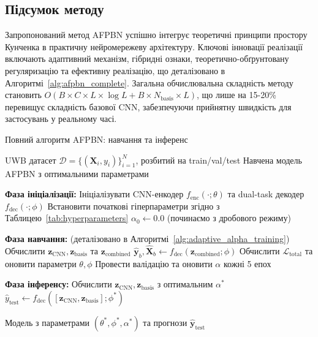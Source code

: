 \documentclass[12pt,a4paper]{article}
\begin{document}
\subsection{Підсумок методу}
\label{sec:method_summary}

Запропонований метод AFPBN успішно інтегрує теоретичні принципи простору Кунченка в практичну нейромережеву архітектуру. Ключові інновації реалізації включають адаптивний механізм, гібридні ознаки, теоретично-обґрунтовану регуляризацію та ефективну реалізацію, що деталізовано в Алгоритмі~\ref{alg:afpbn_complete}. Загальна обчислювальна складність методу становить $O(B \times C \times L \times \log L + B \times N_{\text{basis}} \times L)$, що лише на 15-20\% перевищує складність базової CNN, забезпечуючи прийнятну швидкість для застосувань у реальному часі.

\begin{algorithm}[htbp]
	\caption{Повний алгоритм AFPBN: навчання та інференс}
	\label{alg:afpbn_complete}
	\begin{algorithmic}[1]
		\REQUIRE UWB датасет $\mathcal{D} = \{(\mathbf{X}_i, y_i)\}_{i=1}^N$, розбитий на train/val/test
		\ENSURE Навчена модель AFPBN з оптимальними параметрами
		
		\STATE \textbf{Фаза ініціалізації:}
		\STATE Ініціалізувати CNN-енкодер $f_{\text{enc}}(\cdot; \theta)$ та dual-task декодер $f_{\text{dec}}(\cdot; \phi)$
		\STATE Встановити початкові гіперпараметри згідно з Таблицею~\ref{tab:hyperparameters}
		\STATE $\alpha_0 \leftarrow 0.0$ (починаємо з дробового режиму)
		
		\STATE \textbf{Фаза навчання:} (деталізовано в Алгоритмі~\ref{alg:adaptive_alpha_training})
		\STATE Обчислити $\mathbf{z}_{\text{CNN}}, \mathbf{z}_{\text{basis}}$ та $\mathbf{z}_{\text{combined}}$
		\STATE $\hat{\mathbf{y}}_b, \hat{\mathbf{X}}_b \leftarrow f_{\text{dec}}(\mathbf{z}_{\text{combined}}; \phi)$
		\STATE Обчислити $\mathcal{L}_{\text{total}}$ та оновити параметри $\theta, \phi$
		\ENDFOR
		\STATE Провести валідацію та оновити $\alpha$ кожні 5 епох
		\ENDFOR
		
		\STATE \textbf{Фаза інференсу:}
		\STATE Обчислити $\mathbf{z}_{\text{CNN}}, \mathbf{z}_{\text{basis}}$ з оптимальним $\alpha^*$
		\STATE $\hat{y}_{\text{test}} \leftarrow f_{\text{dec}}([\mathbf{z}_{\text{CNN}}, \mathbf{z}_{\text{basis}}]; \phi^*)$
		\ENDFOR
		
		\RETURN Модель з параметрами $(\theta^*, \phi^*, \alpha^*)$ та прогнози $\hat{\mathbf{y}}_{\text{test}}$
	\end{algorithmic}
\end{algorithm}
\end{document}

